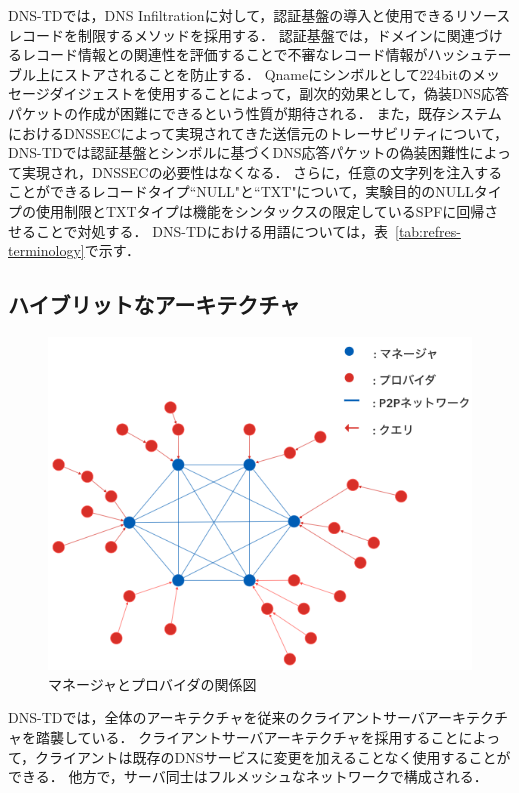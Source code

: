 DNS-TDでは，DNS Infiltrationに対して，認証基盤の導入と使用できるリソースレコードを制限するメソッドを採用する．
認証基盤では，ドメインに関連づけるレコード情報との関連性を評価することで不審なレコード情報がハッシュテーブル上にストアされることを防止する．
Qnameにシンボルとして224bitのメッセージダイジェストを使用することによって，副次的効果として，偽装DNS応答パケットの作成が困難にできるという性質が期待される．
また，既存システムにおけるDNSSECによって実現されてきた送信元のトレーサビリティについて，DNS-TDでは認証基盤とシンボルに基づくDNS応答パケットの偽装困難性によって実現され，DNSSECの必要性はなくなる．
さらに，任意の文字列を注入することができるレコードタイプ``NULL"と``TXT"について，実験目的のNULLタイプの使用制限とTXTタイプは機能をシンタックスの限定しているSPFに回帰させることで対処する．
DNS-TDにおける用語については，表~\ref{tab:refres-terminology}で示す．


\newpage
\subsection{ハイブリットなアーキテクチャ}
\begin{figure}[htbp]
 \centering
 \includegraphics[scale=0.5]{figure/manager-provider.png}
 \caption{マネージャとプロバイダの関係図}
 \label{fig:manager-provider}
\end{figure}

DNS-TDでは，全体のアーキテクチャを従来のクライアントサーバアーキテクチャを踏襲している．
クライアントサーバアーキテクチャを採用することによって，クライアントは既存のDNSサービスに変更を加えることなく使用することができる．
他方で，サーバ同士はフルメッシュなネットワークで構成される．

